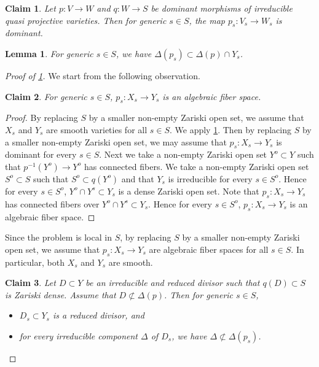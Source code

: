 \documentclass[10pt,a4paper]{amsart}
\newtheorem{lem}{Lemma}
\newtheorem{claim}{Claim}
\begin{document}
\begin{claim}\label{claim:202210221}
Let $p:V\to W$ and $q:W\to S$ be dominant morphisms of irreducible quasi projective varieties.
Then for generic $s\in S$, the map $p_s:V_s\to W_s$ is dominant.
\end{claim}

\begin{lem}\label{lem:20221020}
For generic $s\in S$, we have $\Delta(p_s)\subset \Delta (p)\cap Y_s$.
\end{lem}

\begin{proof}[Proof of \cref{lem:20221020}]
We start from the following observation.

\begin{claim}
For generic $s\in S$, $p_s:X_s\to Y_s$ is an algebraic fiber space.
\end{claim}
\begin{proof}
By replacing $S$ by a smaller non-empty Zariski open set, we assume that $X_s$ and $Y_s$ are smooth varieties for all $s\in S$.
We apply \cref{claim:202210221}.
Then by replacing $S$ by a smaller non-empty Zariski open set, we may assume that $p_s:X_s\to Y_s$ is dominant for every $s\in S$.
Next we take a non-empty Zariski open set $Y^o\subset Y$ such that $p^{-1}(Y^o)\to Y^o$ has connected fibers.
We take a non-empty Zariski open set $S^o\subset S$ such that $S^o\subset q(Y^o)$ and that $Y_s$ is irreducible for every $s\in S^o$.
Hence for every $s\in S^o$, $Y^o\cap Y^s\subset Y_s$ is a dense Zariski open set.
Note that $p_s:X_s\to Y_s$ has connected fibers over $Y^o\cap Y^s\subset Y_s$.
Hence for every $s\in S^o$, $p_s:X_s\to Y_s$ is an algebraic fiber space.
\end{proof}


Since the problem is local in $S$, by replacing $S$ by a smaller non-empty Zariski open set, we assume that $p_s:X_s\to Y_s$ are algebraic fiber spaces for all $s\in S$.
In particular, both $X_s$ and $Y_s$ are smooth.

\begin{claim}\label{claim:202210222}
Let $D\subset Y$ be an irreducible and reduced divisor such that $q(D)\subset S$ is Zariski dense.
Assume that $D\not\subset \Delta(p)$.
Then for generic $s\in S$,
\begin{itemize}
\item
$D_s\subset Y_s$ is a reduced divisor, and
\item
for every irreducible component $\Delta$ of $D_s$, we have $\Delta\not\subset \Delta(p_s)$.
\end{itemize} 
\end{claim}


\end{proof}
\end{document}
